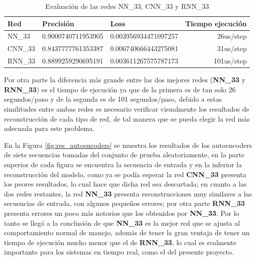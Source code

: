 \begin{table}[H]
\centering
\begin{center}
\begin{tabular}{|l|r|r|r|}
\hline
\textbf{Red} & \multicolumn{1}{l|}{\textbf{Precisi\'{o}n}} & \multicolumn{1}{l|}{\textbf{Loss}} & \multicolumn{1}{l|}{\textbf{Tiempo ejecuci\'{o}n}} \\ \hline
NN\_33              & 0.9000740711953905  & 0.003956934471097257  & 26us/step  \\ \hline
CNN\_33             & 0.8437777761353387  & 0.006740666443275081  & 31us/step  \\ \hline
RNN\_33             & 0.8899259290695191  & 0.003611267575787173  & 101us/step \\ \hline
\end{tabular}
\end{center}
\caption{Evaluaci\'{o}n de las redes NN\_33, CNN\_33 y RNN\_33}
\label{table:evaluacion_redes}
\end{table}

Por otra parte la diferencia m\'{a}s grande entre las dos mejores redes (\textbf{NN\_33} y \textbf{RNN\_33}) es el tiempo de ejecuci\'{o}n ya que de la primera es de tan solo 26 segundos/paso y de la segunda es de 101 segundos/paso, debido a estas similitudes entre ambas redes es necesario verificar visualmente los resultados de reconstrucci\'{o}n de cada tipo de red, de tal manera que se pueda elegir la red m\'{a}s adecuada para este problema. 

\vspace{5mm} %

En la Figura \ref{fig:res_autoencoders} se muestra los resultados de los autoencoders de siete secuencias tomadas del conjunto de prueba aleatoriamente, en la parte superior de cada figura se encuentra la secuencia de entrada y en la inferior la reconstrucci\'{o}n del modelo, como ya se pod\'{i}a esperar la red \textbf{CNN\_33} presenta los peores resultados, lo cual hace que dicha red sea descartada; en cuanto a las dos redes restantes, la red \textbf{NN\_33} presenta reconstrucciones muy similares a las secuencias de entrada, con algunos peque\~{n}os errores; por otra parte \textbf{RNN\_33} presenta errores un poco m\'{a}s notorios que los obtenidos por  \textbf{NN\_33}. Por lo tanto se lleg\'{o} a la conclusi\'{o}n de que \textbf{NN\_33} es la mejor red que se ajusta al comportamiento normal de manejo, adem\'{a}s de tener la gran ventaja de tener un tiempo de ejecuci\'{o}n mucho menor que el de \textbf{RNN\_33}, lo cual es realmente importante para los sistemas en tiempo real, como el del presente proyecto.

